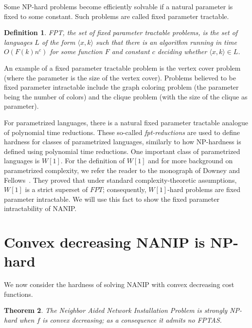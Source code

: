 \documentclass[english]{llncs}
\newtheorem{thm}{Theorem}
\newtheorem{defn}[thm]{Definition}
\begin{document}
Some NP-hard problems become efficiently solvable if a natural parameter is
fixed to some constant. Such problems are called fixed parameter tractable.

\begin{defn}
FPT, the set of \emph{fixed parameter tractable} problems, is the set
of languages $L$ of the form $\langle x,k\rangle$
such that there is an algorithm running in time $O(F(k) n^c)$ for some function
$F$ and constant $c$ deciding whether $\langle x,k\rangle\in L$.
\end{defn}

An example of a fixed parameter tractable problem is the vertex cover problem
(where the parameter is the size of the vertex cover). 
Problems believed to be fixed parameter intractable include the graph coloring problem
(the parameter being the number of colors) and the clique problem (with the size of 
the clique as parameter).

For parametrized languages, there is a natural fixed parameter tractable analogue of polynomial time reductions.
These so-called \emph{fpt-reductions} are used to define hardness for classes of parametrized languages,
similarly to how NP-hardness is defined using polynomial time reductions.
One important class of parametrized languages is $W[1]$. For the definition of $W[1]$ and for more background
on parametrized complexity, we refer the reader to the monograph of Downey and Fellows~\cite{DowneyF13}.
They proved that under standard complexity-theoretic assumptions, $W[1]$ is a strict superset of
$FPT$; consequently, $W[1]$-hard problems are fixed parameter intractable.
We will use this fact to show the fixed parameter intractability of NANIP.


\section{Convex decreasing NANIP is NP-hard} \label{sec:computation} We now
consider the hardness of solving NANIP with convex decreasing cost functions.

\begin{thm} \label{thm:np-hard} The Neighbor Aided Network Installation Problem
is strongly NP-hard when $f$ is convex decreasing; as a consequence it admits
no FPTAS. \end{thm}
\end{document}
